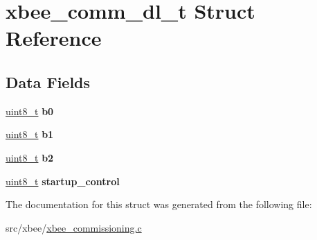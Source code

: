 \hypertarget{structxbee__comm__dl__t}{\section{xbee\-\_\-comm\-\_\-dl\-\_\-t Struct Reference}
\label{structxbee__comm__dl__t}
}
\subsection*{Data Fields}
\begin{DoxyCompactItemize}
\item 
\hypertarget{group__xbee__commissioning_ga9428f4229e2203fa643916ca52a3e663}{\hyperlink{group__hal_gae1affc9ca37cfb624959c866a73f83c2}{uint8\-\_\-t} {\bfseries b0}}\label{group__xbee__commissioning_ga9428f4229e2203fa643916ca52a3e663}

\item 
\hypertarget{group__xbee__commissioning_gac252074002fd2018498430cf078d3c48}{\hyperlink{group__hal_gae1affc9ca37cfb624959c866a73f83c2}{uint8\-\_\-t} {\bfseries b1}}\label{group__xbee__commissioning_gac252074002fd2018498430cf078d3c48}

\item 
\hypertarget{group__xbee__commissioning_gaf1d156a71c42f5c2c5b2554084b0b6de}{\hyperlink{group__hal_gae1affc9ca37cfb624959c866a73f83c2}{uint8\-\_\-t} {\bfseries b2}}\label{group__xbee__commissioning_gaf1d156a71c42f5c2c5b2554084b0b6de}

\item 
\hypertarget{group__xbee__commissioning_ga959afae272eb1d7a12fad05cb5e55ec7}{\hyperlink{group__hal_gae1affc9ca37cfb624959c866a73f83c2}{uint8\-\_\-t} {\bfseries startup\-\_\-control}}\label{group__xbee__commissioning_ga959afae272eb1d7a12fad05cb5e55ec7}

\end{DoxyCompactItemize}


The documentation for this struct was generated from the following file\-:\begin{DoxyCompactItemize}
\item 
src/xbee/\hyperlink{xbee__commissioning_8c}{xbee\-\_\-commissioning.\-c}\end{DoxyCompactItemize}
